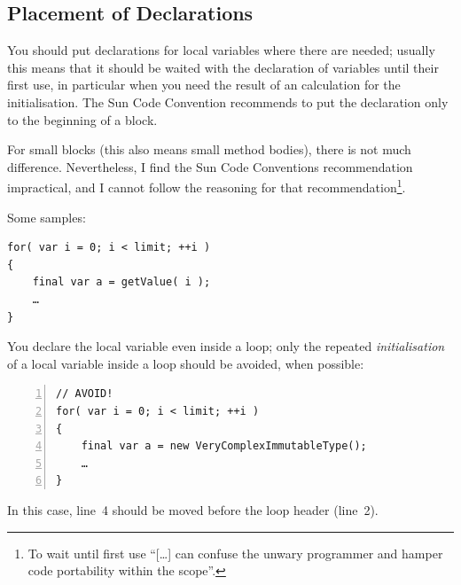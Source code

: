 \documentclass[11pt,a4paper, titlepage, parskip=half, headsepline, footsepline, cleardoublepage=current, headheight=1cm]{scrbook}
\begin{document}
\subsection{Placement of Declarations}
You should put declarations for local variables where there are needed; usually this means that it should be waited with the declaration of variables until their first use, in particular when you need the result of an calculation for the initialisation. The Sun Code Convention\autocite{SUN_CODE_CONVENTIONS:Placement} recommends to put the declaration only to the beginning of a block.

For small blocks (this also means small method bodies), there is not much difference. Nevertheless, I find the Sun Code Conventions recommendation impractical, and I cannot follow the reasoning for that recommendation\footnote{To wait until first use “[…] can confuse the unwary programmer and hamper code portability within the scope”.}.

Some samples:
\begin{lstlisting}
for( var i = 0; i < limit; ++i )
{
    final var a = getValue( i );
    …
}
\end{lstlisting}
You declare the local variable even inside a loop; only the repeated \textit{initialisation} of a local variable inside a loop should be avoided, when possible:
\begin{lstlisting}[numbers=left]
// AVOID!
for( var i = 0; i < limit; ++i )
{
    final var a = new VeryComplexImmutableType();
    …
}
\end{lstlisting}
In this case, line~4 should be moved before the loop header (line~2).

\end{document}
